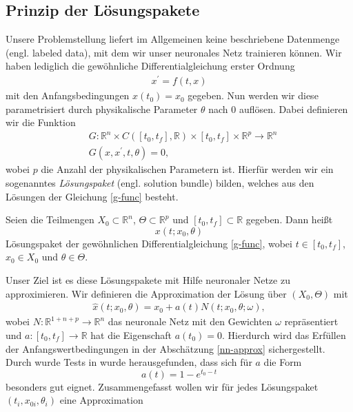 \subsection{Prinzip der Lösungspakete}
\label{subsec:lsgpakete}
Unsere Problemstellung liefert im Allgemeinen keine beschriebene Datenmenge (engl. labeled data), mit dem wir unser
neuronales Netz trainieren können. Wir haben lediglich die gewöhnliche Differentialgleichung erster Ordnung
\begin{align}
    \label{dgl-machinelearnung}
    x^{\prime} = f(t,x)
\end{align}
mit den Anfangsbedingungen $x(t_0)=x_0$ gegeben. Nun werden wir diese parametrisiert durch physikalische Parameter
$\theta$ nach $0$ auflösen. Dabei definieren wir die Funktion
\begin{align}
    \label{g-func}
    &G:\mathbb{R}^n \times C([t_0,t_f],\mathbb{R}) \times [t_0, t_f] \times \mathbb{R}^p \rightarrow \mathbb{R}^n \nonumber\\
    &G \left( x, x^{\prime}, t, \theta \right) = 0,
\end{align}
wobei $p$ die Anzahl der physikalischen Parametern ist. Hierfür werden wir ein sogenanntes \textit{Lösungspaket}
(engl. solution bundle) bilden, welches aus den Lösungen der Gleichung \eqref{g-func} besteht.
\begin{definition}
    \label{sol-bundle}
    Seien die Teilmengen $X_0 \subset \mathbb{R}^n$, $\Theta \subset \mathbb{R}^p$ und $[t_0,t_f] \subset \mathbb{R}$
    gegeben. Dann heißt
    \[
        x(t;x_0, \theta)
    \]
    Lösungspaket der gewöhnlichen Differentialgleichung \eqref{g-func}, wobei $t \in [t_0,t_f]$, $x_0 \in X_0$ und
    $\theta \in \Theta$.
\end{definition}
Unser Ziel ist es diese Lösungspakete mit Hilfe neuronaler Netze zu approximieren. Wir definieren die Approximation der
Lösung über $(X_0,\Theta)$ mit
\begin{align}
    \label{nn-approx}
    \hat{x}(t;x_0, \theta) = x_0 + a(t) N(t; x_0, \theta; \omega),
\end{align}
wobei $N:\mathbb{R}^{1+n+p} \rightarrow \mathbb{R}^n$ das neuronale Netz mit den Gewichten $\omega$ repräsentiert und
$a:[t_0,t_f] \rightarrow \mathbb{R}$ hat die Eigenschaft $a(t_0)=0$. Hierdurch wird das Erfüllen der
Anfangswertbedingungen in der Abschätzung \eqref{nn-approx} sichergestellt. Durch wurde Tests in
\cite{flamantSolvingDifferentialEquations2020} wurde herausgefunden, dass sich für $a$ die Form
\[
    a(t) = 1 - e^{t_0-t}
\]
besonders gut eignet. Zusammengefasst wollen wir für jedes Lösungspaket $(t_i,x_{0i}, \theta_i)$ eine Approximation

